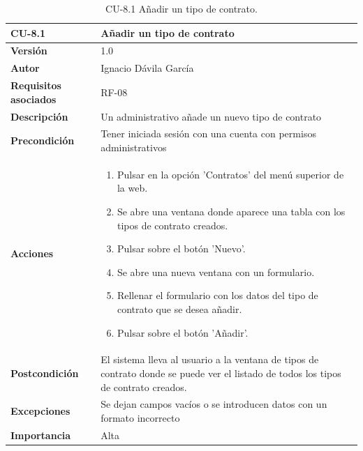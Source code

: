 \begin{table}[p]
	\centering
	\begin{tabularx}{\linewidth}{ p{} p{} }
		\toprule
		\textbf{CU-8.1}    & \textbf{Añadir un tipo de contrato}\\
		\toprule
		\textbf{Versión}              & 1.0    \\
		\textbf{Autor}                & Ignacio Dávila García \\
		\textbf{Requisitos asociados} & RF-08 \\
		\textbf{Descripción}          & Un administrativo añade un nuevo tipo de contrato \\
		\textbf{Precondición}         & Tener iniciada sesión con una cuenta con permisos administrativos \\
		\textbf{Acciones}             &
		\begin{enumerate}
			\def\labelenumi{\arabic{enumi}.}
			\tightlist
			\item Pulsar en la opción 'Contratos' del menú superior de la web.
			\item Se abre una ventana donde aparece una tabla con los tipos de contrato creados.
			\item Pulsar sobre el botón 'Nuevo'.
			\item Se abre una nueva ventana con un formulario.
			\item Rellenar el formulario con los datos del tipo de contrato que se desea añadir.
			\item Pulsar sobre el botón 'Añadir'.
		\end{enumerate}\\
		\textbf{Postcondición}        & El sistema lleva al usuario a la ventana de tipos de contrato donde se puede ver el listado de todos los tipos de contrato creados. \\
		\textbf{Excepciones}          & Se dejan campos vacíos o se introducen datos con un formato incorrecto \\
		\textbf{Importancia}          & Alta \\
		\bottomrule
	\end{tabularx}
	\caption{CU-8.1 Añadir un tipo de contrato.}
\end{table}

